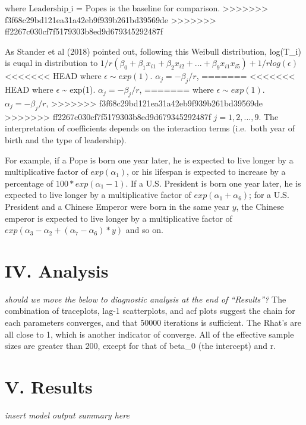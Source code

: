 \documentclass[]{article}
\begin{document}
where \(\text{Leadership_i = Popes}\) is the baseline for comparison.
>>>>>>> f3f68c29bd121ea31a42eb9f939b261bd39569de
>>>>>>> ff2267c030cf7f5179303b8ed9d679345292487f

As Stander et al (2018) pointed out, following this Weibull
distribution, log(T\_i) is euqal in distribution to
\(1/r (\beta_0 + \beta_1x_{i1}+\beta_2x_{i2}+...+\beta_9x_{i1}x_{i5}) + 1/rlog(\epsilon)\)
<<<<<<< HEAD
where \(\epsilon \sim exp(1)\). \(\alpha_j = -\beta_j/r\),
=======
<<<<<<< HEAD
where \(\epsilon\) \textasciitilde{} exp(1). \(\alpha_j = -\beta_j/r\),
=======
where \(\epsilon \sim exp(1)\). \(\alpha_j = -\beta_j/r\),
>>>>>>> f3f68c29bd121ea31a42eb9f939b261bd39569de
>>>>>>> ff2267c030cf7f5179303b8ed9d679345292487f
\(j = 1,2,...,9\). The interpretation of coefficients depends on the
interaction terms (i.e.~both year of birth and the type of leadership).

For example, if a Pope is born one year later, he is expected to live
longer by a multiplicative factor of \(exp(\alpha_1)\), or his lifespan
is expected to increase by a percentage of \(100*exp(\alpha_1-1)\). If a
U.S. President is born one year later, he is expected to live longer by
a multiplicative factor of \(exp(\alpha_1 + \alpha_6)\); for a U.S.
President and a Chinese Emperor were born in the same year \(y\), the
Chinese emperor is expected to live longer by a multiplicative factor of
\(exp(\alpha_3 - \alpha_2 + (\alpha_7-\alpha_6)*y)\) and so on.

\hypertarget{iv.-analysis}{%
\section{IV. Analysis}\label{iv.-analysis}}

\emph{should we move the below to diagnostic analysis at the end of
``Results''?} The combination of traceplots, lag-1 scatterplots, and acf
plots suggest the chain for each parameters converges, and that 50000
iterations is sufficient. The Rhat's are all close to 1, which is
another indicator of converge. All of the effective sample sizes are
greater than 200, except for that of beta\_0 (the intercept) and r.

\hypertarget{v.-results}{%
\section{V. Results}\label{v.-results}}

\emph{insert model output summary here}
\end{document}
